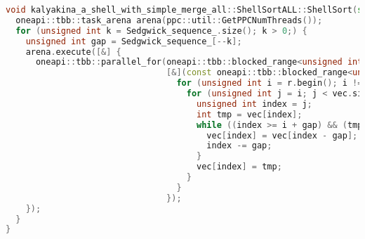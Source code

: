 \documentclass[a4paper,14pt]{extarticle}
\begin{document}
\begin{lstlisting}[language=C++]
void kalyakina_a_shell_with_simple_merge_all::ShellSortALL::ShellSort(std::vector<int> &vec) {
  oneapi::tbb::task_arena arena(ppc::util::GetPPCNumThreads());
  for (unsigned int k = Sedgwick_sequence_.size(); k > 0;) {
    unsigned int gap = Sedgwick_sequence_[--k];
    arena.execute([&] {
      oneapi::tbb::parallel_for(oneapi::tbb::blocked_range<unsigned int>(0, gap),
                                [&](const oneapi::tbb::blocked_range<unsigned int> &r) {
                                  for (unsigned int i = r.begin(); i != r.end(); i++) {
                                    for (unsigned int j = i; j < vec.size(); j += gap) {
                                      unsigned int index = j;
                                      int tmp = vec[index];
                                      while ((index >= i + gap) && (tmp < vec[index - gap])) {
                                        vec[index] = vec[index - gap];
                                        index -= gap;
                                      }
                                      vec[index] = tmp;
                                    }
                                  }
                                });
    });
  }
}
\end{lstlisting}
\end{document}
